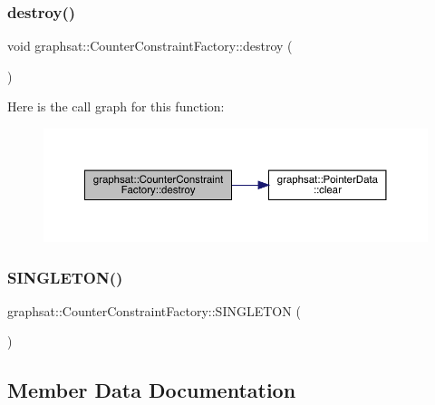 \subsubsection{\texorpdfstring{destroy()}{destroy()}}
{\footnotesize\ttfamily void graphsat\+::\+Counter\+Constraint\+Factory\+::destroy (\begin{DoxyParamCaption}{ }\end{DoxyParamCaption})\hspace{0.3cm}{\ttfamily [inline]}}

Here is the call graph for this function\+:\nopagebreak
\begin{figure}[H]
\begin{center}
\leavevmode
\includegraphics[width=350pt]{classgraphsat_1_1_counter_constraint_factory_a7372d026e014236a543dce09909406de_cgraph}
\end{center}
\end{figure}
\mbox{\label{classgraphsat_1_1_counter_constraint_factory_a0138990409398673821c41dd2e468b43}} 
\subsubsection{\texorpdfstring{SINGLETON()}{SINGLETON()}}
{\footnotesize\ttfamily graphsat\+::\+Counter\+Constraint\+Factory\+::\+S\+I\+N\+G\+L\+E\+T\+ON (\begin{DoxyParamCaption}\item[{\mbox{\hyperlink{classgraphsat_1_1_counter_constraint_factory}{Counter\+Constraint\+Factory}}}]{ }\end{DoxyParamCaption})\hspace{0.3cm}{\ttfamily [private]}}



\subsection{Member Data Documentation}
\mbox{\label{classgraphsat_1_1_counter_constraint_factory_a228041246730a92798c374c31515e478}} 

